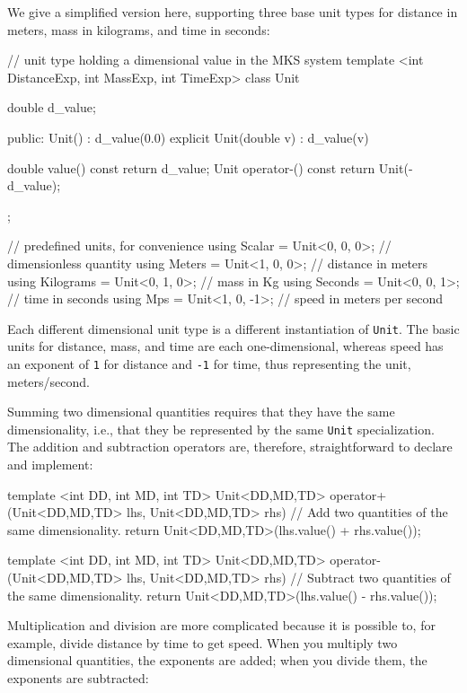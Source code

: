 We give a simplified version here, supporting three base unit types for
distance in meters, mass in kilograms, and time in seconds:

\begin{emcppslisting}
// unit type holding a dimensional value in the MKS system
template <int DistanceExp, int MassExp, int TimeExp>
class Unit
{
    double d_value;

public:
    Unit() : d_value(0.0) { }
    explicit Unit(double v) : d_value(v) { }

    double value() const { return d_value; }
    Unit operator-() const { return Unit(-d_value); }
};

// predefined units, for convenience
using Scalar    = Unit<0, 0, 0>;   // dimensionless quantity
using Meters    = Unit<1, 0, 0>;   // distance in meters
using Kilograms = Unit<0, 1, 0>;   // mass in Kg
using Seconds   = Unit<0, 0, 1>;   // time in seconds
using Mps       = Unit<1, 0, -1>;  // speed in meters per second
\end{emcppslisting}
    

\noindent Each different dimensional unit type is a different instantiation of
\lstinline!Unit!. The basic units for distance, mass, and time are each
one-dimensional, whereas speed has an exponent of \lstinline!1! for
distance and \lstinline!-1! for time, thus representing the unit,
meters/second.

Summing two dimensional quantities requires that they have the same
dimensionality, i.e., that they be represented by the same \lstinline!Unit!
specialization. The addition and subtraction operators are, therefore,
straightforward to declare and implement:

\begin{emcppslisting}
template <int DD, int MD, int TD>
Unit<DD,MD,TD> operator+(Unit<DD,MD,TD> lhs, Unit<DD,MD,TD> rhs)
    // Add two quantities of the same dimensionality.
{
    return Unit<DD,MD,TD>(lhs.value() + rhs.value());
}

template <int DD, int MD, int TD>
Unit<DD,MD,TD> operator-(Unit<DD,MD,TD> lhs, Unit<DD,MD,TD> rhs)
    // Subtract two quantities of the same dimensionality.
{
    return Unit<DD,MD,TD>(lhs.value() - rhs.value());
}
\end{emcppslisting}
    

\noindent Multiplication and division are more complicated because it is possible
to, for example, divide distance by time to get speed. When you multiply
two dimensional quantities, the exponents are added; when you divide
them, the exponents are subtracted:

